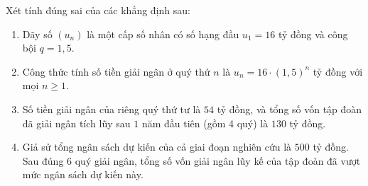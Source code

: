 \documentclass[12pt, a4paper]{article}
\begin{document}
\begin{center}
\end{center}
Xét tính đúng sai của các khẳng định sau:
\begin{enumerate}[label=\alph*),leftmargin=*]
\item Dãy số $(u_n)$ là một cấp số nhân có số hạng đầu $u_1 = 16$ tỷ đồng và công bội $q = 1{,}5$.
\item Công thức tính số tiền giải ngân ở quý thứ $n$ là $u_n = 16 \cdot (1{,}5)^n$ tỷ đồng với mọi $n \ge 1$.
\item Số tiền giải ngân của riêng quý thứ tư là $54$ tỷ đồng, và tổng số vốn tập đoàn đã giải ngân tích lũy sau $1$ năm đầu tiên (gồm 4 quý) là $130$ tỷ đồng.
\item Giả sử tổng ngân sách dự kiến của cả giai đoạn nghiên cứu là $500$ tỷ đồng. Sau đúng $6$ quý giải ngân, tổng số vốn giải ngân lũy kế của tập đoàn đã vượt mức ngân sách dự kiến này.
\end{enumerate}
\end{document}
